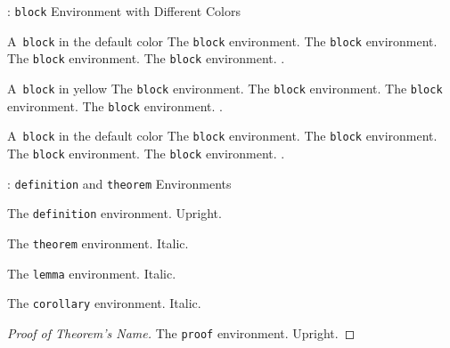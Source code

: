 \begin{frame}{\titleprefix: \texttt{block} Environment with Different Colors}

\begin{block}{A~\texttt{block} in the default color}
	The \texttt{block} environment. The \texttt{block} environment. The \texttt{block} environment. The \texttt{block} environment. \insertblocktitle.\strut  %
\end{block}%

{%
	\renewcommand{\framedblockcolor}{UBonnYellow}%
	\begin{block}{A~\texttt{block} in yellow}
		The \texttt{block} environment. The \texttt{block} environment. The \texttt{block} environment. The \texttt{block} environment. \insertblocktitle.\strut  %
	\end{block}%
}

\begin{block}{A~\texttt{block} in the default color}
	The \texttt{block} environment. The \texttt{block} environment. The \texttt{block} environment. The \texttt{block} environment. \insertblocktitle.\strut  %
\end{block}%

\end{frame}


\begin{frame}{\titleprefix: \texttt{definition} and \texttt{theorem} Environments}

\begin{definition}
	The \texttt{definition} environment. Upright.
\end{definition}

\begin{theorem}
	The \texttt{theorem} environment. Italic.
\end{theorem}%

\begin{lemma}
	The \texttt{lemma} environment. Italic.
\end{lemma}%

\begin{corollary}
	The \texttt{corollary} environment. Italic.
\end{corollary}%

\begin{proof}[Proof of Theorem's Name]
	The \texttt{proof} environment. Upright.
\end{proof}

\end{frame}


